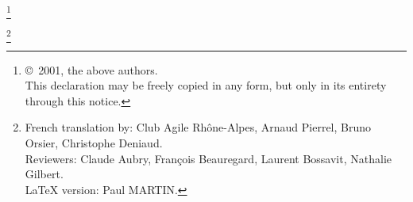 \documentclass[11pt,a4paper]{article}
\newcommand\blfootnote[1]{%
  \begingroup
  \renewcommand\thefootnote{}\footnote{#1}%
  \addtocounter{footnote}{-1}%
  \endgroup
}
\begin{document}
\blfootnote{\copyright~2001, the above authors.\\This declaration may be freely copied in any form, but only in its entirety through this notice.}
\blfootnote{French translation by: Club Agile Rhône-Alpes, Arnaud Pierrel, Bruno Orsier, Christophe Deniaud.\\Reviewers: Claude Aubry, François Beauregard, Laurent Bossavit, Nathalie Gilbert.\\LaTeX version: Paul MARTIN.}
\end{document}

